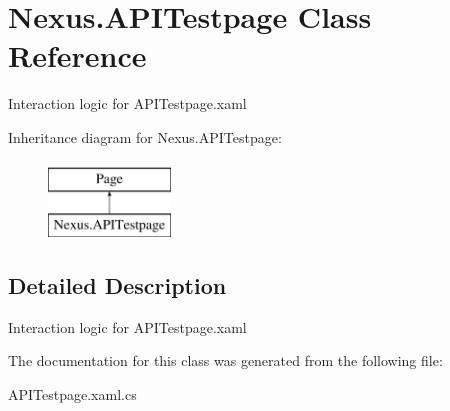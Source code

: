 \hypertarget{class_nexus_1_1_a_p_i_testpage}{}\section{Nexus.\+A\+P\+I\+Testpage Class Reference}
\label{class_nexus_1_1_a_p_i_testpage}


Interaction logic for A\+P\+I\+Testpage.\+xaml  


Inheritance diagram for Nexus.\+A\+P\+I\+Testpage\+:\begin{figure}[H]
\begin{center}
\leavevmode
\includegraphics[height=2.000000cm]{class_nexus_1_1_a_p_i_testpage}
\end{center}
\end{figure}


\subsection{Detailed Description}
Interaction logic for A\+P\+I\+Testpage.\+xaml 



The documentation for this class was generated from the following file\+:\begin{DoxyCompactItemize}
\item 
A\+P\+I\+Testpage.\+xaml.\+cs\end{DoxyCompactItemize}
